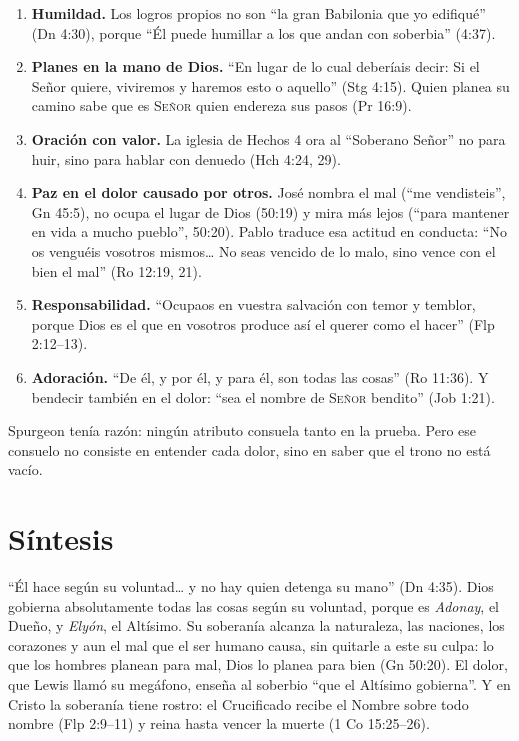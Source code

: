 \documentclass[11pt,letterpaper]{article}
\newcommand{\SENOR}{\textsc{Señor}}
\newcommand{\destacar}[1]{\textbf{\textcolor{azul}{#1}}}
\begin{document}
\begin{enumerate}
\item \destacar{Humildad.} Los logros propios no son ``la gran Babilonia que yo edifiqué'' (Dn 4:30), porque ``Él puede humillar a los que andan con soberbia'' (4:37).
\item \destacar{Planes en la mano de Dios.} ``En lugar de lo cual deberíais decir: Si el Señor quiere, viviremos y haremos esto o aquello'' (Stg 4:15). Quien planea su camino sabe que es \SENOR{} quien endereza sus pasos (Pr 16:9).
\item \destacar{Oración con valor.} La iglesia de Hechos 4 ora al ``Soberano Señor'' no para huir, sino para hablar con denuedo (Hch 4:24, 29).
\item \destacar{Paz en el dolor causado por otros.} José nombra el mal (``me vendisteis'', Gn 45:5), no ocupa el lugar de Dios (50:19) y mira más lejos (``para mantener en vida a mucho pueblo'', 50:20). Pablo traduce esa actitud en conducta: ``No os venguéis vosotros mismos\ldots{} No seas vencido de lo malo, sino vence con el bien el mal'' (Ro 12:19, 21).
\item \destacar{Responsabilidad.} ``Ocupaos en vuestra salvación con temor y temblor, porque Dios es el que en vosotros produce así el querer como el hacer'' (Flp 2:12--13).
\item \destacar{Adoración.} ``De él, y por él, y para él, son todas las cosas'' (Ro 11:36). Y bendecir también en el dolor: ``sea el nombre de \SENOR{} bendito'' (Job 1:21).
\end{enumerate}

Spurgeon tenía razón: ningún atributo consuela tanto en la prueba. Pero ese consuelo no consiste en entender cada dolor, sino en saber que el trono no está vacío.

\section{Síntesis}

``Él hace según su voluntad\ldots{} y no hay quien detenga su mano'' (Dn 4:35). Dios gobierna absolutamente todas las cosas según su voluntad, porque es \emph{Adonay}, el Dueño, y \emph{Elyón}, el Altísimo. Su soberanía alcanza la naturaleza, las naciones, los corazones y aun el mal que el ser humano causa, sin quitarle a este su culpa: lo que los hombres planean para mal, Dios lo planea para bien (Gn 50:20). El dolor, que Lewis llamó su megáfono, enseña al soberbio ``que el Altísimo gobierna''. Y en Cristo la soberanía tiene rostro: el Crucificado recibe el Nombre sobre todo nombre (Flp 2:9--11) y reina hasta vencer la muerte (1 Co 15:25--26).
\end{document}
